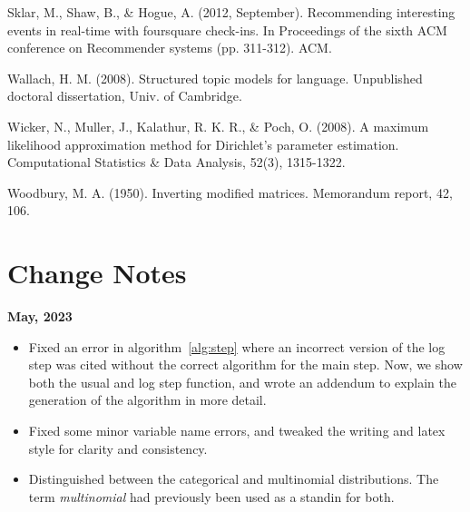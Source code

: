 \documentclass[twoside]{article}
\begin{document}
\begin{thebibliography}{20}
Sklar, M., Shaw, B., \& Hogue, A. (2012, September). Recommending interesting events in real-time with foursquare check-ins. In Proceedings of the sixth ACM conference on Recommender systems (pp. 311-312). ACM.

Wallach, H. M. (2008). Structured topic models for language. Unpublished doctoral dissertation, Univ. of Cambridge.

Wicker, N., Muller, J., Kalathur, R. K. R., \& Poch, O. (2008). A maximum likelihood approximation method for Dirichlet's parameter estimation. Computational Statistics \& Data Analysis, 52(3), 1315-1322.

Woodbury, M. A. (1950). Inverting modified matrices. Memorandum report, 42, 106.

\end{thebibliography}

\section{Change Notes}
\textbf{May, 2023}
\begin{itemize}
    \item Fixed an error in algorithm~\ref{alg:step} where an incorrect version of the log step was cited without the correct algorithm for the main step. Now, we show both the usual and log step function, and wrote an addendum\cite{addendum} to explain the generation of the algorithm in more detail.
    \item Fixed some minor variable name errors, and tweaked the writing and latex style for clarity and consistency.
    \item Distinguished between the categorical and multinomial distributions. The term \textit{multinomial} had previously been used as a standin for both.
\end{itemize}
\end{document}
